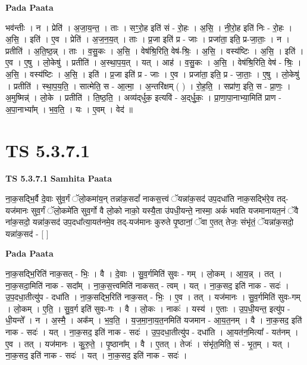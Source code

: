 \documentclass[17pt]{extarticle}
\begin{document}
\textbf{Pada Paata} \newline

भव॑न्तीः । न । प्रेति॑ । अ॒जा॒य॒न्त॒ । ताः । सꣳ॒॒रो॒ह इति॑ सं - रो॒हः । अ॒सि॒ । नी॒रो॒ह इति॑ निः - रो॒हः । अ॒सि॒ । इति॑ । ए॒व । प्रेति॑ । अ॒ज॒न॒य॒त् । ताः । प्र॒जा इति॑ प्र - जाः । प्रजा॑ता॒ इति॒ प्र-जा॒ताः॒ । न । प्रतीति॑ । अ॒ति॒ष्ठ॒न्न् । ताः । व॒सु॒कः । अ॒सि॒ । वेष॑श्रि॒रिति॒ वेष॑-श्रिः॒ । अ॒सि॒ । वस्य॑ष्टिः । अ॒सि॒ । इति॑ । ए॒व । ए॒षु । लो॒केषु॑ । प्रतीति॑ । अ॒स्था॒प॒य॒त् । यत् । आह॑ । व॒सु॒कः । अ॒सि॒ । वेष॑श्रि॒रिति॒ वेष॑ - श्रिः॒ । अ॒सि॒ । वस्य॑ष्टिः । अ॒सि॒ । इति॑ । प्र॒जा इति॑ प्र - जाः । ए॒व । प्रजा॑ता॒ इति॒ प्र - जा॒ताः॒ । ए॒षु । लो॒केषु॑ । प्रतीति॑ । स्था॒प॒य॒ति॒ । सात्मेति॒ स - आ॒त्मा॒ । अ॒न्तरि॑क्षम् ( ) । रो॒ह॒ति॒ । सप्रा॑ण॒ इति॒ स - प्रा॒णः॒ । अ॒मुष्मिन्न्॑ । लो॒के । प्रतीति॑ । ति॒ष्ठ॒ति॒ । अव्य॑द्‌र्धुक॒ इत्यवि॑ - अ॒द्‌र्धु॒कः॒ । प्रा॒णा॒पा॒नाभ्या॒मिति॑ प्राण - अ॒पा॒नाभ्या᳚म् । भ॒व॒ति॒ । यः । ए॒वम् । वेद॑ ॥  \newline





\section{ TS 5.3.7.1 }

\textbf{TS 5.3.7.1 } \newline
\textbf{Samhita Paata} \newline

ना॒क॒सद्भि॒र्वै दे॒वाः सु॑व॒र्गं ॅलो॒कमा॑य॒न् तन्ना॑क॒सदां᳚ नाकस॒त्त्वं ॅयन्ना॑क॒सद॑ उप॒दधा॑ति नाक॒सद्भि॑रे॒व तद्-यज॑मानः सुव॒र्गं ॅलो॒कमे॑ति सुव॒र्गो वै लो॒को नाको॒ यस्यै॒ता उ॑पधी॒यन्ते॒ नास्मा॒ अकं॑ भवति यजमानायत॒नं ॅवै ना॑क॒सदो॒ यन्ना॑क॒सद॑ उप॒दधा᳚त्या॒यत॑नमे॒व तद्-यज॑मानः कुरुते पृ॒ष्ठानां॒ ॅवा ए॒तत् तेजः॒ संभृ॑तं॒ ॅयन्ना॑क॒सदो॒ यन्ना॑क॒सद॑ - [  ] \newline

\textbf{Pada Paata} \newline

ना॒क॒सद्भि॒रिति॑ नाक॒सत् - भिः॒ । वै । दे॒वाः । सु॒व॒र्गमिति॑ सुवः - गम् । लो॒कम् । आ॒य॒न्न् । तत् । ना॒क॒सदा॒मिति॑ नाक - सदा᳚म् । ना॒क॒स॒त्त्वमिति॑ नाकसत् - त्वम् । यत् । ना॒क॒सद॒ इति॑ नाक - सदः॑ । उ॒प॒दधा॒तीत्यु॑प - दधा॑ति । ना॒क॒सद्भि॒रिति॑ नाक॒सत् - भिः॒ । ए॒व । तत् । यज॑मानः । सु॒व॒र्गमिति॑ सुवः-गम् । लो॒कम् । ए॒ति॒ । सु॒व॒र्ग इति॑ सुवः-गः । वै । लो॒कः । नाकः॑ । यस्य॑ । ए॒ताः । उ॒प॒धी॒यन्त॒ इत्यु॑प - धी॒यन्ते᳚ । न । अ॒स्मै॒ । अक᳚म् । भ॒व॒ति॒ । य॒ज॒मा॒ना॒य॒त॒नमिति॑ यजमान - आ॒य॒त॒नम् । वै । ना॒क॒सद॒ इति॑ नाक - सदः॑ । यत् । ना॒क॒सद॒ इति॑ नाक - सदः॑ । उ॒प॒दधा॒तीत्यु॑प - दधा॑ति । आ॒यत॑न॒मित्या᳚ - यत॑नम् । ए॒व । तत् । यज॑मानः । कु॒रु॒ते॒ । पृ॒ष्ठाना᳚म् । वै । ए॒तत् । तेजः॑ । संभृ॑त॒मिति॒ सं - भृ॒त॒म् । यत् । ना॒क॒सद॒ इति॑ नाक - सदः॑ । यत् । ना॒क॒सद॒ इति॑ नाक - सदः॑ ।  \newline
\end{document}
